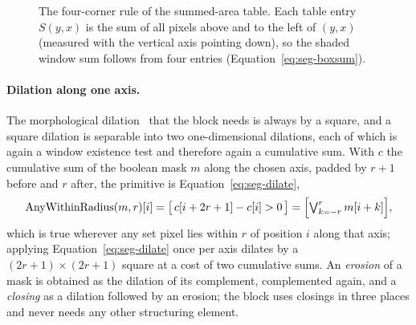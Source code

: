 \begin{figure}[h]
\centering
{}
\caption{The four-corner rule of the summed-area table. Each table entry $S(y,x)$ is the sum of all pixels above and to the left of $(y,x)$ (measured with the vertical axis pointing down), so the shaded window sum follows from four entries (Equation~\ref{eq:seg-boxsum}).}
\label{fig:seg-boxsum}
\end{figure}

\paragraph{Dilation along one axis.}
The morphological dilation~\cite{haralick1987} that the block needs is always by a square, and a square dilation is separable into two one-dimensional dilations, each of which is again a window existence test and therefore again a cumulative sum.
With $c$ the cumulative sum of the boolean mask $m$ along the chosen axis, padded by $r+1$ before and $r$ after, the primitive is Equation~\ref{eq:seg-dilate},
\begin{equation}
\mathrm{AnyWithinRadius}(m,r)[i]=\bigl[\,c[i+2r+1]-c[i]>0\,\bigr]=\Bigl[\textstyle\bigvee_{k=-r}^{r} m[i+k]\Bigr],
\label{eq:seg-dilate}
\end{equation}
which is true wherever any set pixel lies within $r$ of position $i$ along that axis; applying Equation~\ref{eq:seg-dilate} once per axis dilates by a $(2r+1)\times(2r+1)$ square at a cost of two cumulative sums.
An \emph{erosion} of a mask is obtained as the dilation of its complement, complemented again, and a \emph{closing} as a dilation followed by an erosion; the block uses closings in three places and never needs any other structuring element.

